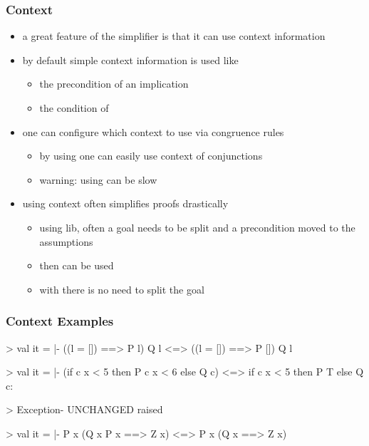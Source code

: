\begin{frame}[fragile]
\frametitle{Context}

\begin{itemize}
\item a great feature of the simplifier is that it can use context information
\item by default simple context information is used like
\begin{itemize}
\item the precondition of an implication
\item the condition of  
\end{itemize}
\item one can configure which context to use via congruence rules
\begin{itemize}
\item \eg by using  one can easily use context of conjunctions
\item warning: using  can be slow
\end{itemize}
\item using context often simplifies proofs drastically
\begin{itemize}
\item using  lib, often a goal needs to be split and a precondition moved to the assumptions
\item then  can be used
\item with  there is no need to split the goal
\end{itemize}
\end{itemize}
\end{frame}


\begin{frame}[fragile]
\frametitle{Context Examples}

\begin{semiverbatim}\scriptsize
>  
val it = |- ((l = []) ==> P l) \holAnd{} Q l <=> 
            ((l = []) ==> P []) \holAnd{} Q l

>  
val it = |- (if c \holAnd{} x < 5 then P c \holAnd{} x < 6 else Q c) <=>
            if c \holAnd{} x < 5 then P T else Q c:

>  
Exception- UNCHANGED raised

>  
val it = |- P x \holAnd{} (Q x \holAnd{} P x ==> Z x) <=> P x \holAnd{} (Q x ==> Z x)\end{semiverbatim}
\end{frame}


